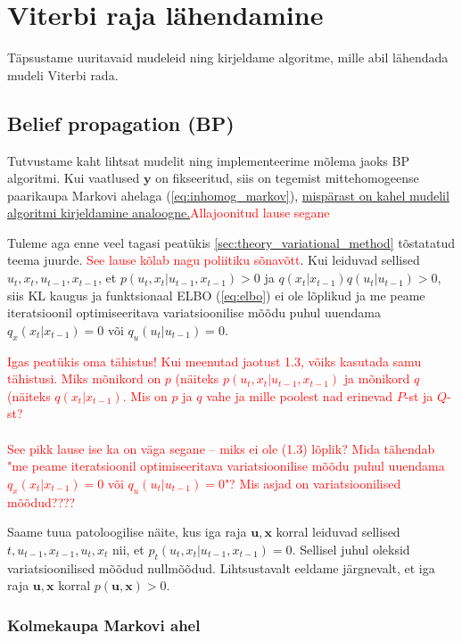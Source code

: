 \section{Viterbi raja lähendamine}

Täpsustame uuritavaid mudeleid ning kirjeldame algoritme, mille abil lähendada mudeli Viterbi rada.

\subsection{Belief propagation (BP)}\label{sec:BP}

Tutvustame kaht lihtsat mudelit ning implementeerime mõlema jaoks BP algoritmi. Kui vaatlused $\mathbf{y}$ on fikseeritud, siis on tegemist mittehomogeense paarikaupa Markovi ahelaga (\ref{eq:inhomog_markov}), \underline{mispärast on kahel mudelil algoritmi kirjeldamine analoogne.}\textcolor{red}{Allajoonitud lause segane}

{Tuleme aga enne veel tagasi peatükis \ref{sec:theory_variational_method} tõstatatud teema juurde.} \textcolor{red}{See lause kõlab nagu poliitiku sõnavõtt}. Kui leiduvad sellised $u_t,x_t,u_{t-1},x_{t-1}$, et $p(u_t,x_t|u_{t-1},x_{t-1}) > 0$ ja $q(x_t|x_{t-1}) q(u_t|u_{t-1})>0$, siis KL kaugus ja funktsionaal ELBO (\ref{eq:elbo}) ei ole lõplikud ja me peame iteratsioonil optimiseeritava variatsioonilise mõõdu puhul uuendama $q_x(x_t|x_{t-1}) = 0$ või $q_u(u_t|u_{t-1})=0$.

\textcolor{red}{Igas peatükis oma tähistus! Kui meenutad jaotust 1.3, võiks kasutada samu tähistusi. Miks mõnikord on $p$ (näiteks $p(u_t,x_t|u_{t-1},x_{t-1})$ ja mõnikord $q$ (näiteks $q(x_t|x_{t-1})$. Mis on $p$ ja $q$ vahe ja mille poolest nad erinevad $P$-st ja $Q$-st?
\\\\
See pikk lause ise ka on väga segane -- miks ei ole (1.3) lõplik? Mida tähendab "me peame iteratsioonil optimiseeritava variatsioonilise mõõdu puhul uuendama $q_x(x_t|x_{t-1}) = 0$ või $q_u(u_t|u_{t-1})=0$"? Mis asjad on variatsioonilised mõõdud???? }



Saame tuua patoloogilise näite, kus iga raja $\bm{u}, \bm{x}$ korral leiduvad sellised $t, u_{t-1},x_{t-1},u_t,x_t$ nii, et
$p_t(u_t,x_t|u_{t-1},x_{t-1}) = 0$. Sellisel juhul oleksid variatsioonilised mõõdud nullmõõdud. Lihtsustavalt eeldame järgnevalt, et iga raja $\bm{u}, \bm{x}$ korral $p(\bm{u}, \bm{x}) > 0$.

\subsubsection{Kolmekaupa Markovi ahel}\label{sec:BP_TMM}

